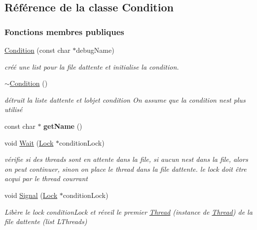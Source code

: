 \hypertarget{class_condition}{}\subsection{Référence de la classe Condition}
\label{class_condition}
\subsubsection*{Fonctions membres publiques}
\begin{DoxyCompactItemize}
\item 
\hyperlink{class_condition_a518a2676e2b33b0481f185d0f942c9c1}{Condition} (const char $\ast$debug\+Name)
\begin{DoxyCompactList}\small\item\em créé une list pour la file d\textquotesingle{}attente et initialise la condition. \end{DoxyCompactList}\item 
\hypertarget{class_condition_ab42f6d2dfb2d0de4bed4ed5032d4a8fc}{}\label{class_condition_ab42f6d2dfb2d0de4bed4ed5032d4a8fc} 
\hyperlink{class_condition_ab42f6d2dfb2d0de4bed4ed5032d4a8fc}{$\sim$\+Condition} ()
\begin{DoxyCompactList}\small\item\em détruit la liste d\textquotesingle{}attente et l\textquotesingle{}objet condition On assume que la condition n\textquotesingle{}est plus utilisé \end{DoxyCompactList}\item 
\hypertarget{class_condition_ad99dd8a0da8377b1c1082d7ff820eaf7}{}\label{class_condition_ad99dd8a0da8377b1c1082d7ff820eaf7} 
const char $\ast$ {\bfseries get\+Name} ()
\item 
void \hyperlink{class_condition_aa0442520888bd371ce07d07c0a4313a7}{Wait} (\hyperlink{class_lock}{Lock} $\ast$condition\+Lock)
\begin{DoxyCompactList}\small\item\em vérifie si des threads sont en attente dans la file, si aucun n\textquotesingle{}est dans la file, alors on peut continuer, sinon on place le thread dans la file d\textquotesingle{}attente. le lock doit être acqui par le thread courrant \end{DoxyCompactList}\item 
void \hyperlink{class_condition_ada25a70d161b7dc9b81eaad0ef66d91c}{Signal} (\hyperlink{class_lock}{Lock} $\ast$condition\+Lock)
\begin{DoxyCompactList}\small\item\em Libère le lock condition\+Lock et réveil le premier \hyperlink{class_thread}{Thread} (instance de \hyperlink{class_thread}{Thread}) de la file d\textquotesingle{}attente (list L\+Threads) \end{DoxyCompactList}\item 

\end{DoxyCompactItemize}
